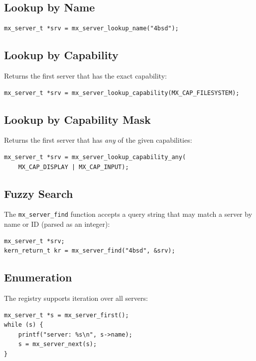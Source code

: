 \documentclass[a4paper,11pt]{article}
\begin{document}
\subsection{Lookup by Name}

\begin{lstlisting}
mx_server_t *srv = mx_server_lookup_name("4bsd");
\end{lstlisting}

\subsection{Lookup by Capability}

Returns the first server that has the exact capability:

\begin{lstlisting}
mx_server_t *srv = mx_server_lookup_capability(MX_CAP_FILESYSTEM);
\end{lstlisting}

\subsection{Lookup by Capability Mask}

Returns the first server that has {\em any} of the given
capabilities:

\begin{lstlisting}
mx_server_t *srv = mx_server_lookup_capability_any(
    MX_CAP_DISPLAY | MX_CAP_INPUT);
\end{lstlisting}

\subsection{Fuzzy Search}

The \texttt{mx\_server\_find} function accepts a query string that
may match a server by name or ID (parsed as an integer):

\begin{lstlisting}
mx_server_t *srv;
kern_return_t kr = mx_server_find("4bsd", &srv);
\end{lstlisting}

\subsection{Enumeration}

The registry supports iteration over all servers:

\begin{lstlisting}
mx_server_t *s = mx_server_first();
while (s) {
    printf("server: %s\n", s->name);
    s = mx_server_next(s);
}
\end{lstlisting}
\end{document}
